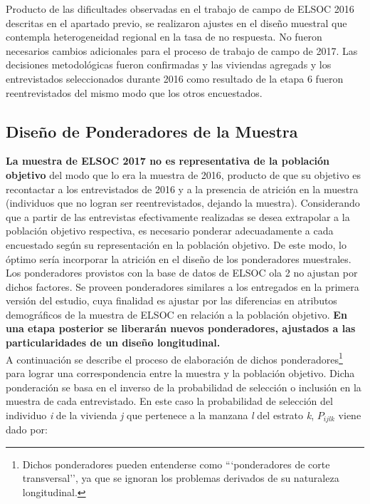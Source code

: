 \documentclass[12pt]{report}
\begin{document}
Producto de las dificultades observadas en el trabajo de campo de ELSOC 2016 descritas en el apartado previo, se realizaron ajustes en el diseño muestral que contempla heterogeneidad regional en la tasa de no respuesta. No fueron necesarios cambios adicionales para el proceso de trabajo de campo de 2017.  Las decisiones metodológicas fueron confirmadas y las viviendas agregads y los entrevistados seleccionados durante 2016 como resultado de la etapa 6 fueron reentrevistados del mismo modo que los otros encuestados. \\


\subsection*{Diseño de Ponderadores de la Muestra} 

\textbf{La muestra de ELSOC 2017 no es representativa de la población objetivo} del modo que lo era la muestra de 2016, producto de que su objetivo es recontactar a los entrevistados de 2016 y a la presencia de atrición en la muestra (individuos que no logran ser reentrevistados, dejando la muestra). Considerando que a partir de las entrevistas efectivamente realizadas se desea extrapolar a la población objetivo respectiva, es necesario ponderar adecuadamente a cada encuestado según su representación en la población objetivo. De este modo, lo óptimo sería incorporar la atrición en el diseño de los ponderadores muestrales.  Los ponderadores provistos con la base de datos de ELSOC ola 2 no ajustan por dichos factores. Se proveen ponderadores similares a los entregados en la primera versión del estudio, cuya finalidad es ajustar por las diferencias en atributos demográficos de la muestra de ELSOC en relación a la población objetivo. \textbf{En una etapa posterior se liberarán nuevos ponderadores, ajustados a las particularidades de un diseño longitudinal.}\\

A continuación se describe el proceso de elaboración de dichos ponderadores\footnote{Dichos ponderadores pueden entenderse como ```ponderadores  de corte transversal'', ya que se ignoran los problemas derivados de su naturaleza longitudinal.} para lograr una correspondencia entre la muestra y la población objetivo. Dicha ponderación se basa en el inverso de la probabilidad de selección o inclusión en la muestra de cada entrevistado. En este caso la probabilidad de selección del individuo  \textit{i} de la vivienda \textit{j} que pertenece a la manzana \textit{l} del estrato \textit{k}, \textit{$P_{ijlk}$} viene dado por:
\end{document}
